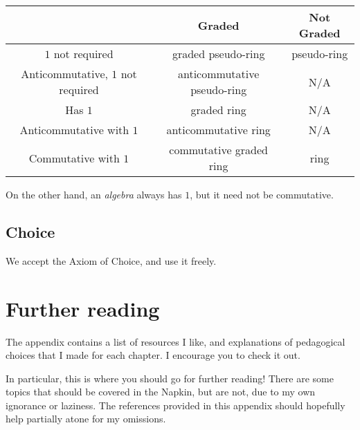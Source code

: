 \begin{center}
	\small
	\begin{tabular}[h]{|c|cc|}
		\hline
		& Graded & Not Graded \\ \hline
		$1$ not required & graded pseudo-ring & pseudo-ring \\
		Anticommutative, $1$ not required & anticommutative pseudo-ring & N/A \\
		Has $1$ & graded ring & N/A \\
		Anticommutative with $1$ & anticommutative ring & N/A \\
		Commutative with $1$ & commutative graded ring & ring \\ \hline
	\end{tabular}
\end{center}

On the other hand, an \emph{algebra} always has $1$,
but it need not be commutative.

\subsection{Choice}
We accept the Axiom of Choice, and use it freely.

\section{Further reading}
The appendix  contains a list of resources I like,
and explanations of pedagogical choices that I made for each chapter.
I encourage you to check it out.

In particular, this is where you should go for further reading!
There are some topics that should be covered in the Napkin,
but are not, due to my own ignorance or laziness.
The references provided in this appendix should hopefully help partially
atone for my omissions.
